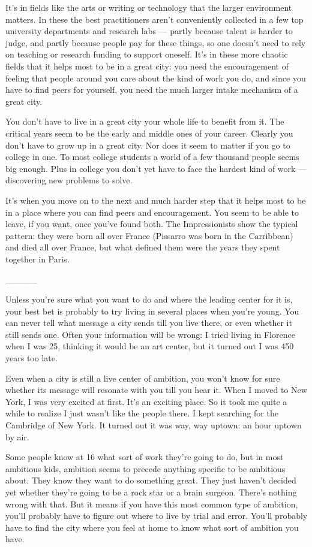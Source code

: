 It's in fields like the arts or writing or technology that the larger
environment matters. In these the best practitioners aren't conveniently
collected in a few top university departments and research labs ---
partly because talent is harder to judge, and partly because people pay
for these things, so one doesn't need to rely on teaching or research
funding to support oneself. It's in these more chaotic fields that it
helps most to be in a great city: you need the encouragement of feeling
that people around you care about the kind of work you do, and since you
have to find peers for yourself, you need the much larger intake
mechanism of a great city.

You don't have to live in a great city your whole life to benefit from
it. The critical years seem to be the early and middle ones of your
career. Clearly you don't have to grow up in a great city. Nor does it
seem to matter if you go to college in one. To most college students a
world of a few thousand people seems big enough. Plus in college you
don't yet have to face the hardest kind of work --- discovering new
problems to solve.

It's when you move on to the next and much harder step that it helps
most to be in a place where you can find peers and encouragement. You
seem to be able to leave, if you want, once you've found both. The
Impressionists show the typical pattern: they were born all over France
(Pissarro was born in the Carribbean) and died all over France, but what
defined them were the years they spent together in Paris.

\_\_\_\_\_

Unless you're sure what you want to do and where the leading center for
it is, your best bet is probably to try living in several places when
you're young. You can never tell what message a city sends till you live
there, or even whether it still sends one. Often your information will
be wrong: I tried living in Florence when I was 25, thinking it would be
an art center, but it turned out I was 450 years too late.

Even when a city is still a live center of ambition, you won't know for
sure whether its message will resonate with you till you hear it. When I
moved to New York, I was very excited at first. It's an exciting place.
So it took me quite a while to realize I just wasn't like the people
there. I kept searching for the Cambridge of New York. It turned out it
was way, way uptown: an hour uptown by air.

Some people know at 16 what sort of work they're going to do, but in
most ambitious kids, ambition seems to precede anything specific to be
ambitious about. They know they want to do something great. They just
haven't decided yet whether they're going to be a rock star or a brain
surgeon. There's nothing wrong with that. But it means if you have this
most common type of ambition, you'll probably have to figure out where
to live by trial and error. You'll probably have to find the city where
you feel at home to know what sort of ambition you have.

